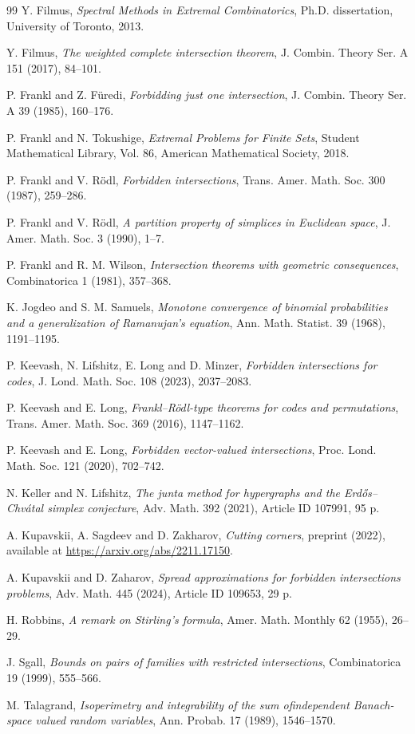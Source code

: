 \documentclass[10pt]{amsart}
\theoremstyle{remark}
\begin{document}
\begin{thebibliography}{99}
 Y. Filmus,
\textit{Spectral Methods in Extremal Combinatorics},
Ph.D. dissertation, University of Toronto, 2013.

 Y. Filmus,
\textit{The weighted complete intersection theorem},
J. Combin. Theory Ser. A 151 (2017), 84--101.

 P. Frankl and Z. F\"{u}redi,
\emph{Forbidding just one intersection}, J. Combin. Theory Ser. A 39 (1985), 160--176.

 P. Frankl and N. Tokushige,
\emph{Extremal Problems for Finite Sets},
Student Mathematical Library, Vol. 86, American Mathematical Society, 2018.

 P. Frankl and V. R\"{o}dl,
\emph{Forbidden intersections}, Trans. Amer. Math. Soc. 300 (1987), 259--286.

 P. Frankl and V. R\"{o}dl,
\emph{A partition property of simplices in Euclidean space},
J. Amer. Math. Soc. 3 (1990), 1--7.

 P. Frankl and R. M. Wilson,
\emph{Intersection theorems with geometric consequences},
Combinatorica 1 (1981), 357--368.

 K. Jogdeo and S. M. Samuels,
\emph{Monotone convergence of binomial probabilities and a generalization of Ramanujan's equation},
Ann. Math. Statist. 39 (1968), 1191--1195.

 P. Keevash, N. Lifshitz, E. Long and D. Minzer,
\emph{Forbidden intersections for codes},
J. Lond. Math. Soc. 108 (2023), 2037--2083.

 P. Keevash and E. Long,
\emph{Frankl--R\"{o}dl-type theorems for codes and permutations},
Trans. Amer. Math. Soc. 369 (2016), 1147--1162.

 P. Keevash and E. Long,
\emph{Forbidden vector-valued intersections},
Proc. Lond. Math. Soc. 121 (2020), 702--742.

 N. Keller and N. Lifshitz,
\emph{The junta method for hypergraphs and the Erd\H{o}s--Chv\'{a}tal simplex conjecture},
Adv. Math. 392 (2021), Article ID 107991, 95 p.

 A. Kupavskii, A. Sagdeev and D. Zakharov,
\emph{Cutting corners}, preprint (2022), available at \url{https://arxiv.org/abs/2211.17150}.

 A. Kupavskii and D. Zaharov,
\emph{Spread approximations for forbidden intersections problems},
Adv. Math. 445 (2024), Article ID 109653, 29 p.

 H. Robbins,
\textit{A remark on Stirling's formula},
Amer. Math. Monthly 62 (1955), 26--29.

 J. Sgall,
\emph{Bounds on pairs of families with restricted intersections},
Combinatorica 19 (1999), 555--566.

 M. Talagrand,
\emph{Isoperimetry and integrability of the sum ofindependent Banach-space valued random variables},
Ann. Probab. 17 (1989), 1546--1570.

\end{thebibliography}
\end{document}
